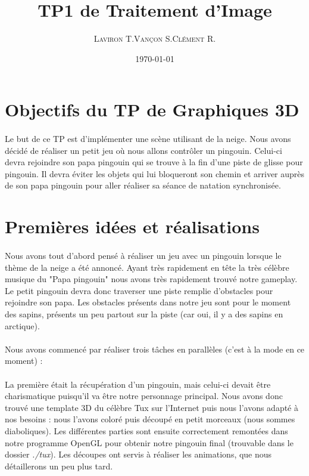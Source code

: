 \documentclass[11pt]{article}
\title{\textbf{TP1 de Traitement d'Image}}
\author{
  \begin{tabular}{ccc}
    \textsc{Laviron T.} & \textsc{Vançon S.} & \textsc{Clément R.}\\
\end{tabular}}
\date{\small \today}
\begin{document}
    \maketitle

    \section*{\bf Objectifs du TP de Graphiques 3D}
    \paragraph{}
    Le but de ce TP est d'implémenter une scène utilisant de la neige.
    Nous avons décidé de réaliser un petit jeu où nous allons contrôler un pingouin.
    Celui-ci devra rejoindre son papa pingouin qui se trouve à la fin d'une piste de glisse pour pingouin.
    Il devra éviter les objets qui lui bloqueront son chemin et arriver auprès de son papa pingouin pour aller réaliser
    sa séance de natation synchronisée.

    \section{Premières idées et réalisations}

    \paragraph{}
    Nous avons tout d'abord pensé à réaliser un jeu avec un pingouin lorsque le thème de la neige a été annoncé.
    Ayant très rapidement en tête la très célèbre musique du "Papa pingouin" nous avons très rapidement trouvé notre gameplay.
    Le petit pingouin devra donc traverser une piste remplie d'obstacles pour rejoindre son papa.
    Les obstacles présents dans notre jeu sont pour le moment des sapins, présents un peu partout sur la piste (car oui, il y a des sapins en arctique).

    \paragraph{}
    Nous avons commencé par réaliser trois tâches en parallèles (c'est à la mode en ce moment) :

    \paragraph{}
    La première était la récupération d'un pingouin, mais celui-ci devait être charismatique puisqu'il va être notre personnage principal.
    Nous avons donc trouvé une template 3D du célèbre Tux sur l'Internet puis nous l'avons adapté à nos besoins : nous l'avons coloré puis découpé en petit morceaux (nous sommes diaboliques).
    Les différentes parties sont ensuite correctement remontées dans notre programme OpenGL pour obtenir notre pingouin final (trouvable dans le dossier \textit{./tux}).
    Les découpes ont servis à réaliser les animations, que nous détaillerons un peu plus tard.
\end{document}
